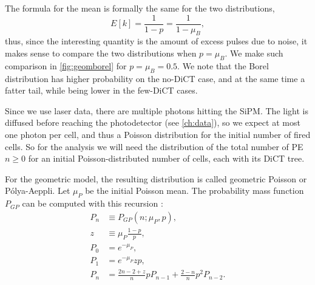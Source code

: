 The formula for the mean is formally the same for the two distributions,
%
\begin{equation}
    E[k] = \frac 1 {1 - p} = \frac 1 {1 - \mu_B},
\end{equation}
%
thus, since the interesting quantity is the amount of excess pulses due to
noise, it makes sense to compare the two distributions when $p = \mu_B$. We
make such comparison in \autoref{fig:geomborel} for $p = \mu_B = 0.5$. We note
that the Borel distribution has higher probability on the no-DiCT case, and at
the same time a fatter tail, while being lower in the few-DiCT cases.

\begin{figure}
    

    
\end{figure}

Since we use laser data, there are multiple photons hitting the SiPM. The light
is diffused before reaching the photodetector (see \autoref{ch:data}), so we
expect at most one photon per cell, and thus a Poisson distribution for the
initial number of fired cells. So for the analysis we will need the
distribution of the total number of PE $n \ge 0$ for an initial
Poisson-distributed number of cells, each with its DiCT tree.

For the geometric model, the resulting distribution is called geometric Poisson
or Pólya-Aeppli. Let $\mu_P$ be the initial Poisson mean. The probability mass
function $P_{GP}$ can be computed with this recursion \cite[5]{nuel2008}:
%
\begin{align}
    P_n &\equiv P_{GP}(n;\mu_P,p), \\
    z &\equiv \mu_P \frac{1-p}p, \\
    P_0 &= e^{-\mu_P}, \\
    P_1 &= e^{-\mu_P} zp, \\
    P_n &= \frac{2n - 2 + z}n p P_{n-1} + \frac{2-n}n p^2 P_{n-2}.
    \label{eq:geompoisson}
\end{align}

